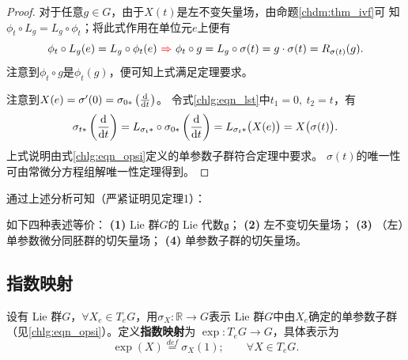 \begin{proof}
对于任意$g\in G$，由于$X(t)$是左不变矢量场，由命题\ref{chdm:thm_ivf}可
知$\phi_t\circ L_g = L_g\circ \phi_t$；将此式作用在单位元$e$上便有
\begin{equation}
    \phi_t\circ L_g (e)= L_g\circ \phi_t (e) {\ \color{red}\Rightarrow \ }
    \phi_t\circ g= L_g\circ \sigma(t) = g\cdot \sigma(t) = R_{\sigma(t)}(g).
\end{equation}
注意到$\phi_t\circ g$是$\phi_t(g)$，便可知上式满足定理要求。

    注意到$X(e)=\sigma'(0)=\sigma_{0*}\left(\frac{{\rm d}}{{\rm d}t}\right)$。
令式\eqref{chlg:eqn_lst}中$t_1=0,\ t_2=t$，有
\begin{equation}
    \sigma_{t*}\left( \frac{{\rm d}}{{\rm d}t}\right) 
    =L_{\sigma_{t}*}\circ\sigma_{0*}\left(\frac{{\rm d}}{{\rm d}t}\right)
    =L_{\sigma_{t}*}\bigl(X(e)\bigr) = X\bigl(\sigma(t)\bigr).
\end{equation}
上式说明由式\eqref{chlg:eqn_opsi}定义的单参数子群符合定理中要求。
$\sigma(t)$的唯一性可由常微分方程组解唯一性定理得到。
\end{proof}

通过上述分析可知（严紧证明见\parencite[\S 2.1]{xiang-hou-meng-2014}定理1）：
\begin{theorem}\label{chlg:thm_la4}
    如下四种表述等价：
    {\bfseries (1)}  Lie 群$G$的 Lie 代数$\mathfrak{g}$；
    {\bfseries (2)} 左不变切矢量场；
    {\bfseries (3)} （左）单参数微分同胚群的切矢量场；
    {\bfseries (4)} 单参数子群的切矢量场。
\end{theorem}


  

\subsection{指数映射}\label{chlg:sec_exp-map}

\begin{definition}\label{chlg:def_exp-map}
    设有 Lie 群$G$，$\forall X_e \in T_eG$，用$\sigma_X:\mathbb{R}\to G$表示
     Lie 群$G$中由$X_e$确定的单参数子群（见\eqref{chlg:eqn_opsi}）。定义\textbf{指数映射}为
    $\exp : T_e G \to G$，具体表示为
    \begin{equation}\label{chlg:eqn_exp-map}
        \exp(X) \overset{def}{=} \sigma_X(1); \qquad \forall X \in T_eG . 
    \end{equation}
\end{definition}



